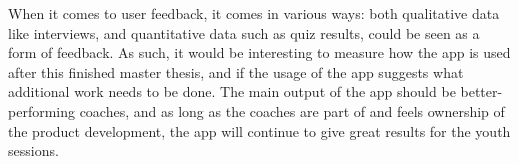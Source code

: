 When it comes to user feedback, it comes in various ways: both qualitative data like interviews, and quantitative data such as quiz results, could be seen as a form of feedback. As such, it would be interesting to measure how the app is used after this finished master thesis, and if the usage of the app suggests what additional work needs to be done. The main output of the app should be better-performing coaches, and as long as the coaches are part of and feels ownership of the product development, the app will continue to give great results for the youth sessions.


